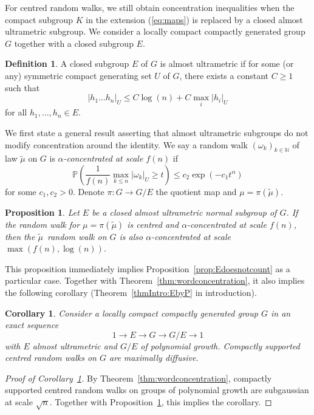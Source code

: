 \documentclass[11pt,leqno]{article}
\theoremstyle{plain}
\newtheorem{corollary}[theorem]{Corollary}
\newtheorem{proposition}[theorem]{Proposition}
\theoremstyle{definition}
\newtheorem{definition}[theorem]{Definition}
\theoremstyle{remark}
\numberwithin{equation}{section}
\begin{document}
For centred random walks, we still obtain concentration inequalities when the compact subgroup $K$ in the extension (\ref{eq:maps}) is replaced by a closed almost ultrametric subgroup. We consider a locally compact compactly generated group $G$ together with a closed subgroup $E$.

\begin{definition}\label{def:distortion}
A closed subgroup $E$ of $G$ is almost ultrametric if for some (or any) symmetric compact generating set $U$ of $G$, there exists a constant $C\ge 1$ such that
\[
|h_1\dots h_n|_U \le C\log(n)+C\max_{i}|h_i|_U
\]
for all $h_1,\dots,h_n \in E$.
\end{definition}

We first state a general result asserting that almost ultrametric subgroups do not modify concentration around the identity. We say a random walk $(\omega_k)_{k\in \mathbb{N}}$ of law $\tilde{\mu}$ on $G$ is \emph{ $\alpha$-concentrated at scale $f(n)$} if
\[
\mathbb{P}\left( \frac{1}{f(n)} \max_{k\le n}|\omega_k|_U\ge t\right) \le c_2\exp\left(-c_1t^\alpha\right)
\]
for some $c_1,c_2>0$. Denote $\pi:G \to G/E$ the quotient map and $\mu=\pi(\tilde{\mu})$.

\begin{proposition}\label{prop:EDconc}
Let $E$ be a closed almost ultrametric normal subgroup of $G$. If the  random walk for $\mu=\pi(\tilde{\mu})$ is centred and $\alpha$-concentrated at scale $f(n)$, then the $\tilde{\mu}$~random walk on $G$ is also $\alpha$-concentrated at scale $\max(f(n),\log(n))$.
\end{proposition}

This proposition immediately implies Proposition~\ref{prop:Edoesnotcount} as a particular case.
Together with Theorem~\ref{thm:wordconcentration}, it also implies the following corollary (Theorem~\ref{thmIntro:EbyP} in introduction).

\begin{corollary}\label{cor:EDmax}
Consider a locally compact compactly generated group $G$ in an exact sequence
\[
1\longrightarrow E \longrightarrow G \longrightarrow G/E \longrightarrow 1
\]
with $E$ almost ultrametric and $G/E$ of polynomial growth. Compactly supported centred random walks on $G$ are maximally diffusive.
\end{corollary}

\begin{proof}[Proof of Corollary~\ref{cor:EDmax}]
By Theorem~\ref{thm:wordconcentration}, compactly supported centred random walks on groups of polynomial growth are subgaussian at scale $\sqrt{n}$. Together with Proposition~\ref{prop:EDconc}, this implies the corollary.
\end{proof}
\end{document}
